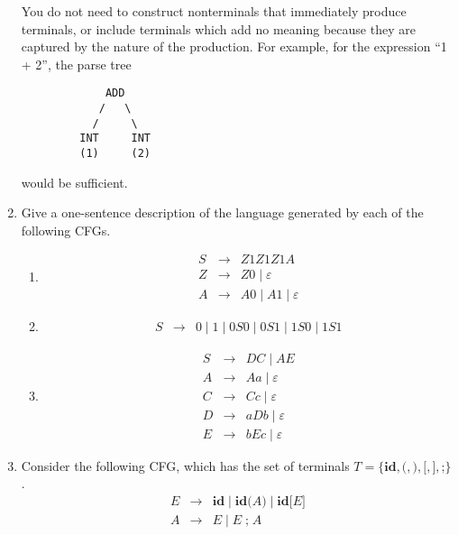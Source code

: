\documentclass[11pt]{article}
\begin{document}
\begin{enumerate}
You do not need to construct nonterminals that immediately produce
terminals, or include terminals which add no meaning because they are
captured by the nature of the production.  For example, for the
expression ``1 + 2'', the parse tree

\begin{verbatim}
             ADD
            /   \ 
           /     \
         INT     INT
         (1)     (2)
\end{verbatim}

would be sufficient.

\item Give a one-sentence description of the language generated by
each of the following CFGs.

\begin{enumerate}

\item
\begin{eqnarray*}
S & \rightarrow & Z1Z1Z1A \\
Z & \rightarrow & Z0 \mid \varepsilon \\
A & \rightarrow & A0 \mid A1 \mid \varepsilon
\end{eqnarray*}

\item
\begin{eqnarray*}
S & \rightarrow & 0 \mid 1 \mid 0S0 \mid 0S1 \mid 1S0 \mid 1S1
\end{eqnarray*}

\item
\begin{eqnarray*}
S & \rightarrow & DC \mid AE \\
A & \rightarrow & Aa \mid \varepsilon \\
C & \rightarrow & Cc \mid \varepsilon \\
D & \rightarrow & aDb \mid \varepsilon \\
E & \rightarrow & bEc \mid \varepsilon
\end{eqnarray*}

\end{enumerate}

\item Consider the following CFG, which has the set of terminals
$T = \{ \textbf{id}, \textbf{(}, \textbf{)}, \textbf{[}, \textbf{]},
\textbf{;} \}$.
\begin{eqnarray*}
E & \rightarrow &
\mathbf{id} \mid \mathbf{id} \textbf{(} A \textbf{)} \mid \textbf{id}
\textbf{[} E \textbf{]} \\
A & \rightarrow & E \mid E \; \textbf{;} \; A
\end{eqnarray*}


\end{enumerate}
\end{document}
